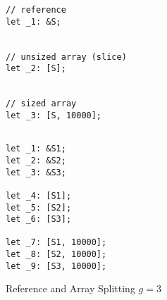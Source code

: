 \documentclass[12pt,oneside]{book}
\begin{document}


\begin{figure*}
  \begin{minipage}[t]{0.5\linewidth}
\begin{verbatim}
// reference
let _1: &S;


// unsized array (slice)
let _2: [S];


// sized array
let _3: [S, 10000];

\end{verbatim}
  \end{minipage}
  \begin{minipage}[t]{0.5\linewidth}
\begin{verbatim}

let _1: &S1;
let _2: &S2;
let _3: &S3;

let _4: [S1];
let _5: [S2];
let _6: [S3];

let _7: [S1, 10000];
let _8: [S2, 10000];
let _9: [S3, 10000];
\end{verbatim}
  \end{minipage}
  
  \caption{Reference and Array Splitting $g = 3$}
  \label{fig:refedecl}
\end{figure*}


\end{document}
